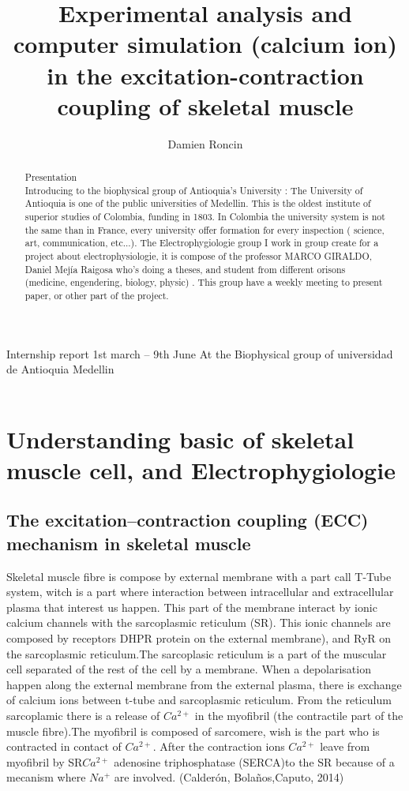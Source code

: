 \documentclass[a4paper,10pt]{report}
\title{Experimental analysis and computer simulation (calcium ion) in the excitation-contraction coupling of skeletal muscle}
\author{Damien Roncin}
\begin{document}
\maketitle
\begin{abstract}
Presentation \\
Introducing to the biophysical group of Antioquia's University :
The University of Antioquia is one of the public universities of Medellin. This is the oldest institute of superior studies of Colombia, funding in 1803. In Colombia the university system is not the same than in France, every university offer formation for every inspection ( science, art, communication, etc...).
The Electrophygiologie group
I work in group create for a project about electrophysiologie, it is compose of the professor MARCO GIRALDO, Daniel Mejía Raigosa who's doing a theses, and student from different orisons (medicine, engendering, biology, physic)  . This group have a weekly meeting to present paper, or other part of the project.

\end{abstract}

Internship report
1st march – 9th June
At the Biophysical group of universidad de Antioquia Medellin\\
\\

\chapter{Understanding basic of skeletal muscle cell, and Electrophygiologie}
\section{The excitation–contraction coupling (ECC) mechanism in skeletal muscle}
Skeletal muscle fibre is compose by external membrane with a part call T-Tube system, witch is a part where interaction between intracellular and extracellular plasma that interest us happen. This part of the membrane interact by ionic calcium channels with the sarcoplasmic reticulum (SR). This ionic channels are composed by receptors DHPR protein on the external membrane), and RyR on the sarcoplasmic reticulum.The sarcoplasic reticulum is a part of the muscular cell separated of the rest of the cell by a membrane. When a depolarisation happen along the external membrane from the external plasma, there is exchange of calcium ions between t-tube and sarcoplasmic reticulum. From the reticulum sarcoplamic there is a release of $Ca^{2+}$ in the myofibril (the contractile part of the muscle fibre).The myofibril is composed of sarcomere, wish is the part who is contracted in contact of $Ca^{2+}$. After the contraction ions $Ca^{2+}$ leave from myofibril by SR$Ca^{2+}$ adenosine triphosphatase (SERCA)to the SR because of a mecanism where $Na^{+}$ are involved.  (Calderón, Bolaños,Caputo, 2014)\\
\end{document}
